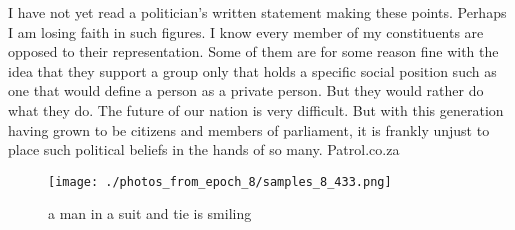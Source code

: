 \documentclass{article}%
\begin{document}
I have not yet read a politician's written statement making these points. Perhaps I am losing faith in such figures. I know every member of my constituents are opposed to their representation. Some of them are for some reason fine with the idea that they support a group only that holds a specific social position such as one that would define a person as a private person. But they would rather do what they do.\newline%
The future of our nation is very difficult. But with this generation having grown to be citizens and members of parliament, it is frankly unjust to place such political beliefs in the hands of so many.\newline%
Patrol.co.za\newline%

%


\begin{figure}[h!]%
\centering%
\texttt{[image: ./photos\_from\_epoch\_8/samples\_8\_433.png]}%
\caption{a man in a suit and tie is smiling}%
\end{figure}

%
\end{document}
